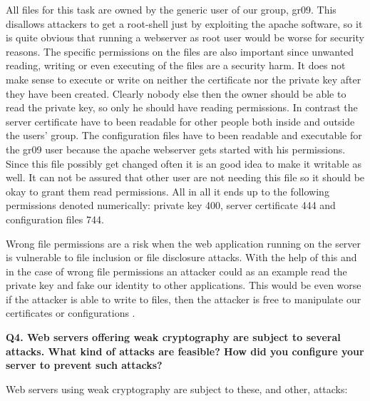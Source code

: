 \noindent
All files for this task are owned by the generic user of our group, gr09. This disallows attackers to get a root-shell just by exploiting the apache software, so it is quite obvious that running a webserver as root user would be worse for security reasons. The specific permissions on the files are also important since unwanted reading, writing or even executing of the files are a security harm. It does not make sense to execute or write on neither the certificate nor the private key after they have been created. Clearly nobody else then the owner should be able to read the private key, so only he should have reading permissions. In contrast the server certificate have to been readable for other people both inside and outside the users' group. The configuration files have to been readable and executable for the gr09 user because the apache webserver gets started with his permissions. Since this file possibly get changed often it is an good idea to make it writable as well. 
It can not be assured that other user are not needing this file so it should be okay to grant them read permissions. All in all it ends up to the following permissions denoted numerically: private key 400, server certificate 444 and configuration files 744. \cite {linuxsecurity} 
\newline

\noindent
Wrong file permissions are a risk when the web application running on the server is vulnerable to file inclusion or file disclosure attacks. With the help of this and in the case of wrong file permissions an attacker could as an example read the private key and fake our identity to other applications. This would be even worse if the attacker is able to write to files, then the attacker is free to manipulate our certificates or configurations \cite{InclDiscl}.
\newline


\noindent
{\bf Q4. Web servers offering weak cryptography are subject to several attacks.
What kind of attacks are feasible? How did you configure your server to prevent such attacks?}
\newline

\noindent
Web servers using weak cryptography are subject to these, and other, attacks:

